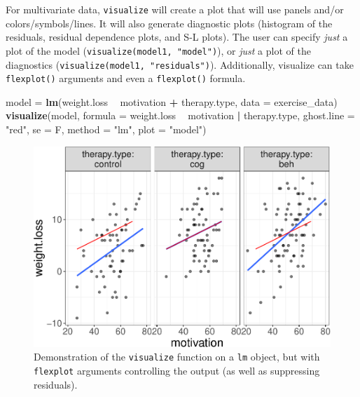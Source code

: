 \documentclass[
  doc]{apa6}
\newenvironment{Shaded}{\begin{snugshade}}{\end{snugshade}}
\newcommand{\DataTypeTok}[1]{\textcolor[rgb]{0.13,0.29,0.53}{#1}}
\newcommand{\KeywordTok}[1]{\textcolor[rgb]{0.13,0.29,0.53}{\textbf{#1}}}
\newcommand{\NormalTok}[1]{#1}
\newcommand{\OperatorTok}[1]{\textcolor[rgb]{0.81,0.36,0.00}{\textbf{#1}}}
\newcommand{\StringTok}[1]{\textcolor[rgb]{0.31,0.60,0.02}{#1}}
\begin{document}
For multivariate data, \texttt{visualize} will create a plot that will use panels and/or colors/symbols/lines. It will also generate diagnostic plots (histogram of the residuals, residual dependence plots, and S-L plots). The user can specify \emph{just} a plot of the model (\texttt{visualize(model1,\ "model")}), or \emph{just} a plot of the diagnostics (\texttt{visualize(model1,\ "residuals")}). Additionally, visualize can take \texttt{flexplot()} arguments and even a \texttt{flexplot()} formula.

\begin{Shaded}
\begin{Highlighting}[]
\NormalTok{model =}\StringTok{ }\KeywordTok{lm}\NormalTok{(weight.loss }\OperatorTok{~}\StringTok{ }\NormalTok{motivation }\OperatorTok{+}\StringTok{ }\NormalTok{therapy.type, }\DataTypeTok{data =}\NormalTok{ exercise_data)}
\KeywordTok{visualize}\NormalTok{(model, }\DataTypeTok{formula =}\NormalTok{ weight.loss }\OperatorTok{~}\StringTok{ }\NormalTok{motivation }\OperatorTok{|}\StringTok{ }\NormalTok{therapy.type, }
          \DataTypeTok{ghost.line =} \StringTok{"red"}\NormalTok{, }\DataTypeTok{se =}\NormalTok{ F, }\DataTypeTok{method =} \StringTok{"lm"}\NormalTok{, }\DataTypeTok{plot =} \StringTok{"model"}\NormalTok{)}
\end{Highlighting}
\end{Shaded}

\begin{figure}
\centering
\includegraphics{flexplot_psychmeth_files/figure-latex/ancova2-1.pdf}
\caption{\label{fig:ancova2}Demonstration of the \texttt{visualize} function on a \texttt{lm} object, but with \texttt{flexplot} arguments controlling the output (as well as suppressing residuals). \label{fig:ancova2}}
\end{figure}
\end{document}
